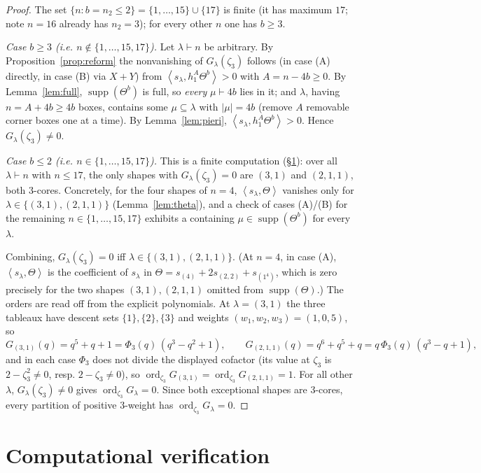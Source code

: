 \documentclass[11pt]{article}
\theoremstyle{definition}
\theoremstyle{remark}
\DeclareMathOperator{\ord}{ord}
\DeclareMathOperator{\supp}{supp}
\newcommand{\la}{\lambda}
\newcommand{\inner}[1]{\left\langle #1 \right\rangle}
\newcommand{\zt}{\zeta_3}
\begin{document}
\begin{proof}
The set $\{n:b=n_2\le2\}=\{1,\dots,15\}\cup\{17\}$ is finite (it has maximum $17$; note
$n=16$ already has $n_2=3$); for every other $n$ one has $b\ge3$.

\emph{Case $b\ge3$ (i.e. $n\notin\{1,\dots,15,17\}$).} Let $\la\vdash n$ be arbitrary.
By Proposition~\ref{prop:reform} the nonvanishing of $G_\la(\zt)$ follows (in case (A)
directly, in case (B) via $X+Y$) from $\inner{s_\la,h_1^{A}\Theta^{b}}>0$ with
$A=n-4b\ge0$. By Lemma~\ref{lem:full}, $\supp(\Theta^{b})$ is full, so \emph{every}
$\mu\vdash4b$ lies in it; and $\la$, having $n=A+4b\ge4b$ boxes, contains some
$\mu\subseteq\la$ with $|\mu|=4b$ (remove $A$ removable corner boxes one at a time). By
Lemma~\ref{lem:pieri}, $\inner{s_\la,h_1^{A}\Theta^{b}}>0$. Hence $G_\la(\zt)\neq0$.

\emph{Case $b\le2$ (i.e. $n\in\{1,\dots,15,17\}$).} This is a finite computation
(\S\ref{sec:verif}): over all $\la\vdash n$ with $n\le17$, the only shapes with
$G_\la(\zt)=0$ are $(3,1)$ and $(2,1,1)$, both $3$-cores. Concretely, for the four shapes
of $n=4$, $\inner{s_\la,\Theta}$ vanishes only for $\la\in\{(3,1),(2,1,1)\}$
(Lemma~\ref{lem:theta}), and a check of cases (A)/(B) for the remaining
$n\in\{1,\dots,15,17\}$ exhibits a containing $\mu\in\supp(\Theta^{b})$ for every
$\la$.

Combining, $G_\la(\zt)=0$ iff $\la\in\{(3,1),(2,1,1)\}$. (At $n=4$, in case (A),
$\inner{s_\la,\Theta}$ is the coefficient of $s_\la$ in
$\Theta=s_{(4)}+2s_{(2,2)}+s_{(1^4)}$, which is zero precisely for the two shapes
$(3,1),(2,1,1)$ omitted from $\supp(\Theta)$.) The orders are read off from the
explicit polynomials. At $\la=(3,1)$ the three tableaux have descent sets
$\{1\},\{2\},\{3\}$ and weights $(w_1,w_2,w_3)=(1,0,5)$, so
\[
  G_{(3,1)}(q)=q^5+q+1=\Phi_3(q)\,(q^3-q^2+1),\qquad
  G_{(2,1,1)}(q)=q^6+q^5+q=q\,\Phi_3(q)\,(q^3-q+1),
\]
and in each case $\Phi_3$ does not divide the displayed cofactor (its value at $\zt$ is
$2-\zt^2\neq0$, resp. $2-\zt\neq0$), so $\ord_{\zt}G_{(3,1)}=\ord_{\zt}G_{(2,1,1)}=1$.
For all other $\la$, $G_\la(\zt)\neq0$ gives $\ord_{\zt}G_\la=0$. Since both exceptional
shapes are $3$-cores, every partition of positive $3$-weight has $\ord_{\zt}G_\la=0$.
\end{proof}

\section{Computational verification}\label{sec:verif}
\end{document}
